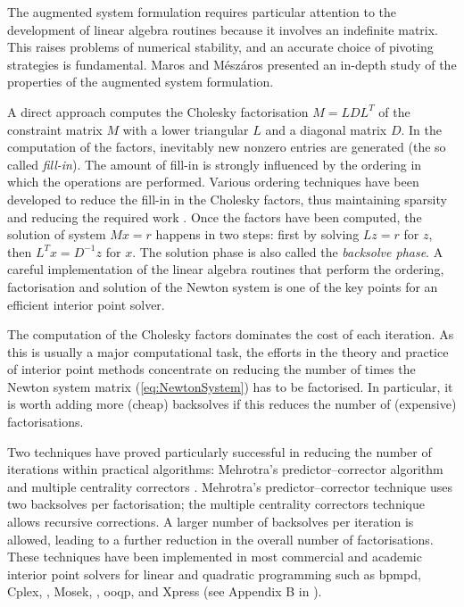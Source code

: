 The augmented system formulation requires particular attention 
to the development of linear algebra routines because
it involves an indefinite matrix. This raises problems of numerical
stability, and an accurate choice of pivoting strategies is fundamental.
Maros and M\'esz\'aros \cite{MarosMeszaros} presented an in-depth 
study of the properties of the augmented system formulation.

A direct approach computes the Cholesky factorisation $M=LDL^T$
of the constraint matrix $M$ with a lower triangular $L$ and
a diagonal matrix $D$.
In the computation of the factors, inevitably new nonzero entries
are generated (the so called {\em fill-in}). The amount of
fill-in is strongly influenced by the ordering in which the
operations are performed.
Various ordering techniques have been developed to reduce the fill-in
in the Cholesky factors, thus maintaining sparsity and 
reducing the required work \cite{RothbergHendrickson}.
Once the factors have been computed, the solution of system $Mx = r$ 
happens in two steps:
first by solving $Lz = r$ for $z$, then $L^Tx = D^{-1}z$ for $x$.
The solution phase is also called the {\em backsolve phase}.
A careful implementation of the linear algebra routines that perform
the ordering, factorisation and solution of the Newton system is
one of the key points for an efficient interior point solver.

The computation of the Cholesky factors
dominates the cost of each iteration.
As this is usually a major computational task, 
the efforts in the theory and practice of 
interior point methods concentrate on reducing 
the number of times the Newton system matrix (\ref{eq:NewtonSystem}) 
has to be factorised.
In particular, it is worth adding more (cheap) 
backsolves if this reduces the number of (expensive) factorisations. 

Two techniques have proved particularly successful in reducing 
the number of iterations within practical algorithms:
Mehrotra's predictor--corrector algorithm \cite{Mehrotra92} 
and multiple centrality correctors \cite{Gondzio96}. 
Mehrotra's predictor--corrector technique \cite{Mehrotra92} uses two 
backsolves per factorisation; the multiple centrality correctors technique
\cite{Gondzio96} allows recursive corrections. A larger number 
of backsolves per iteration is allowed, leading to a further reduction 
in the overall number of factorisations. 
These 
techniques have been implemented in most commercial and academic 
interior point solvers for linear and quadratic programming such 
as {\sc bpmpd}, Cplex, \HOPDM, Mosek, \OOPS, {\sc ooqp}, \PCx and Xpress
(see Appendix B in \cite{ipm:Wright97}).

